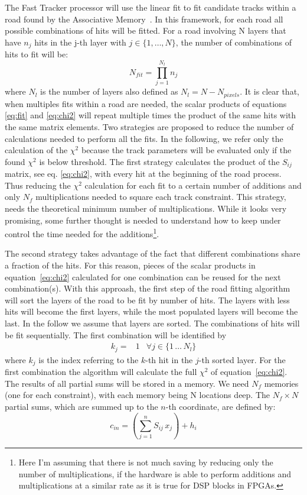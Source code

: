 \documentclass[a4paper,11pt]{article}
\begin{document}
The Fast Tracker processor will use the linear fit to fit candidate tracks within a road found by the Associative Memory~\cite{FTK-IEEE-1}.
In this framework, for each road all possible combinations of hits will be fitted.
For a road involving N layers that have $n_j$ hits in the j-th layer with $j \in \{1, \ldots, N \}$, the number of combinations of hits to fit will be:
\begin{equation}
    N_{fit} = \prod_{j=1}^{N_l} n_j 
\end{equation}
where $N_l$ is the number of layers also defined as $N_l = N - N_{pixels}$.  
It is clear that, when multiples fits within a road are needed, the scalar products of equations \eqref{eq:fit} and \eqref{eq:chi2} will repeat multiple times the product of the same hits with the same matrix elements.
Two strategies are proposed to reduce the number of calculations needed to perform all the fits.
In the following, we refer only the calculation of the $\chi^2$ because the track parameters will be evaluated only if the found $\chi^2$ is below threshold.
The first strategy calculates the product of the $S_{ij}$ matrix, see eq. \eqref{eq:chi2}, with every hit at the beginning of the road process. Thus reducing the $\chi^2$ calculation for each fit to a certain number of additions and only $N_f$ multiplications needed to square each track constraint. This strategy, needs the theoretical minimum number of multiplications. While it looks very promising, some further thought is needed to understand how to keep under control the time needed for the additions\footnote{Here I'm assuming that there is not much saving by reducing only the number of multiplications, if the hardware is able to perform additions and multiplications at a similar rate as it is true for DSP blocks in FPGAs.}.


The second strategy takes advantage of the fact that different combinations share a fraction of the hits.
For this reason, pieces of the scalar products in equation~\eqref{eq:chi2} calculated for one combination can be reused for the next combination(s).
With this approash, the first step of the road fitting algorithm will sort the layers of the road to be fit by number of hits. The layers with less hits will become the first layers, while the most populated layers will become the last.
In the follow we assume that layers are sorted.
The combinations of hits will be fit sequentially. The first combination will be identified by 
\begin{align}
k_j=&1 & \forall j \in \{1\, \ldots\, N_l\}
\end{align}
where $k_j$ is the index referring to the $k$-th hit in the $j$-th sorted layer.
For the first combination the algorithm will calculate the full $\chi^2$ of equation~\eqref{eq:chi2}. The results of all partial sums will be stored in a memory. We need $N_f$ memories (one for each constraint), with each memory being N locations deep. The $N_f \times N$ partial sums, which are summed up to the $n$-th coordinate, are defined by:
\begin{equation}
  \label{eq:partial_c}
  c_{in} =  \left( \sum_{j=1}^n S_{ij} \, x_j \right) + h_i
\end{equation}
\end{document}
